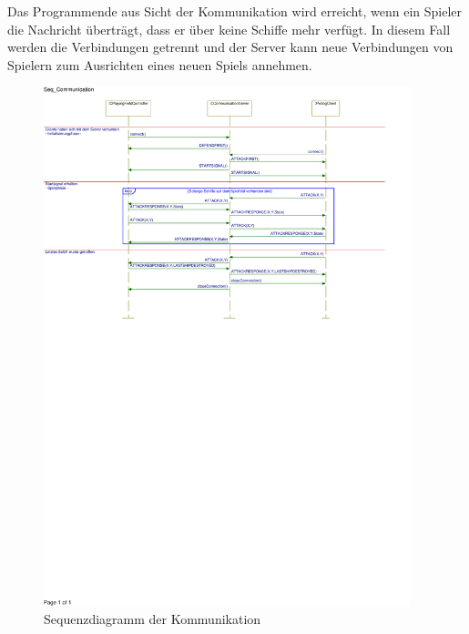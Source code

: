 Das Programmende aus Sicht der Kommunikation wird erreicht, wenn ein Spieler die Nachricht überträgt, dass er über keine Schiffe mehr verfügt.
In diesem Fall werden die Verbindungen getrennt und der Server kann neue Verbindungen von Spielern zum Ausrichten eines neuen Spiels annehmen.

\begin{figure}[H]
  \centering
  \includegraphics[trim=0mm 160mm 25mm 5mm,clip,width=0.95\textwidth]{images/SeqCommunication.pdf}
  \caption{Sequenzdiagramm der Kommunikation}
  \label{fig:Kommunikationssequenz}
\end{figure}


